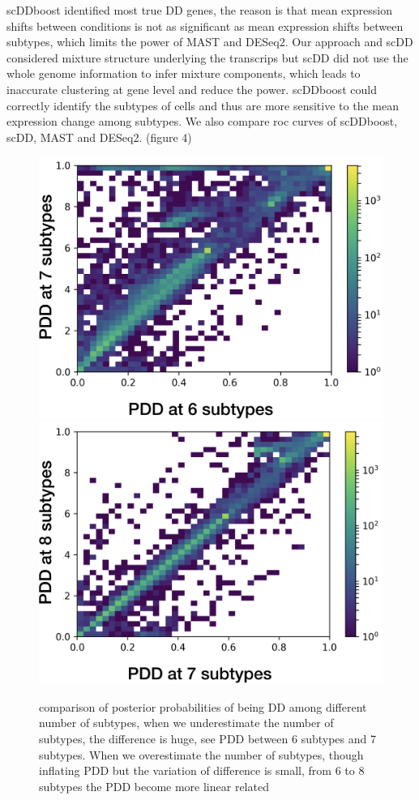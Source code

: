 \documentclass[11pt]{amsart}
\begin{document}
scDDboost identified most true DD genes, the reason is that mean expression shifts between conditions is not as significant as mean expression shifts between subtypes, which limits the power of MAST and DESeq2. Our approach and scDD considered mixture structure underlying the transcrips but scDD did not use the whole genome information to infer mixture components, which leads to inaccurate clustering at gene level and reduce the power. scDDboost could correctly identify the subtypes of cells and thus are more sensitive to the mean expression change among subtypes. We also compare roc curves of scDDboost, scDD, MAST and DESeq2. (figure 4)
\begin{figure}[h]
\vspace{-\parskip}
  \includegraphics[width=\textwidth]{sim_67.png}
\endminipage\hfill
{}
  \includegraphics[width=\textwidth]{sim_78.png}
  \endminipage
\caption{comparison of posterior probabilities of being DD among different number of subtypes, when we underestimate the number of subtypes, the difference is huge, see PDD between 6 subtypes and 7 subtypes. When we overestimate the number of subtypes, though inflating PDD but the variation of difference is small, from 6 to 8 subtypes the PDD become more linear related}
\end{figure}
\end{document}
